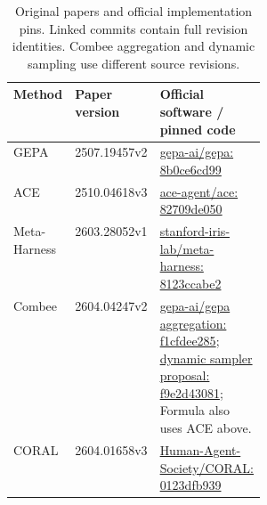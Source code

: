 \begin{table}[H]
\caption{Original papers and official implementation pins. Linked commits contain full revision identities. Combee aggregation and dynamic sampling use different source revisions.}
\label{tab:pins}
\small
\begin{tabularx}{\linewidth}{@{}p{0.15\linewidth}p{0.18\linewidth}Y@{}}
\toprule
Method & Paper version & Official software / pinned code \\
\midrule
GEPA & 2507.19457v2 & \href{https://github.com/gepa-ai/gepa/tree/8b0ce6cd99a234f6b74daf37558a2ac0ce18f975}{gepa-ai/gepa: 8b0ce6cd99} \\
ACE & 2510.04618v3 & \href{https://github.com/ace-agent/ace/tree/82709de050e1db6e6ef2f07bcb0393560b94992a}{ace-agent/ace: 82709de050} \\
Meta-Harness & 2603.28052v1 & \href{https://github.com/stanford-iris-lab/meta-harness/tree/8123ccabe2b19fa1123090b2e5f1bacc20963ce8}{stanford-iris-lab/meta-harness: 8123ccabe2} \\
Combee & 2604.04247v2 & \href{https://github.com/gepa-ai/gepa/tree/f1cfdee2856e9dc4b5b4dc5cc2e391d0aa20d819}{gepa-ai/gepa aggregation: f1cfdee285}; \href{https://github.com/gepa-ai/gepa/tree/f9e2d430815e5a0b36d58d1dab2f36f8082759e4}{dynamic sampler proposal: f9e2d43081}; Formula also uses ACE above. \\
CORAL & 2604.01658v3 & \href{https://github.com/Human-Agent-Society/CORAL/tree/0123dfb939b35228cf2c1fde224cd0561e727408}{Human-Agent-Society/CORAL: 0123dfb939} \\
\bottomrule
\end{tabularx}
\end{table}
